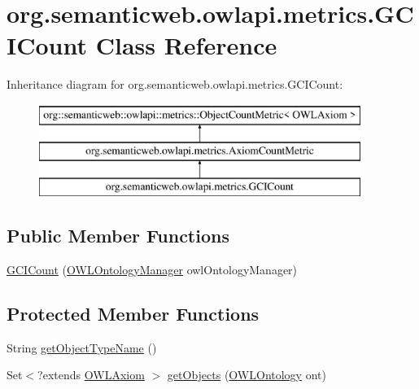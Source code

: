 \hypertarget{classorg_1_1semanticweb_1_1owlapi_1_1metrics_1_1_g_c_i_count}{\section{org.\-semanticweb.\-owlapi.\-metrics.\-G\-C\-I\-Count Class Reference}
\label{classorg_1_1semanticweb_1_1owlapi_1_1metrics_1_1_g_c_i_count}
}
Inheritance diagram for org.\-semanticweb.\-owlapi.\-metrics.\-G\-C\-I\-Count\-:\begin{figure}[H]
\begin{center}
\leavevmode
\includegraphics[height=3.000000cm]{classorg_1_1semanticweb_1_1owlapi_1_1metrics_1_1_g_c_i_count}
\end{center}
\end{figure}
\subsection*{Public Member Functions}
\begin{DoxyCompactItemize}
\item 
\hyperlink{classorg_1_1semanticweb_1_1owlapi_1_1metrics_1_1_g_c_i_count_a8bb59b6539e3c448c78168fefa54969f}{G\-C\-I\-Count} (\hyperlink{interfaceorg_1_1semanticweb_1_1owlapi_1_1model_1_1_o_w_l_ontology_manager}{O\-W\-L\-Ontology\-Manager} owl\-Ontology\-Manager)
\end{DoxyCompactItemize}
\subsection*{Protected Member Functions}
\begin{DoxyCompactItemize}
\item 
String \hyperlink{classorg_1_1semanticweb_1_1owlapi_1_1metrics_1_1_g_c_i_count_a0a45f120439e6c54787a4cf54cf50fb7}{get\-Object\-Type\-Name} ()
\item 
Set$<$?extends \hyperlink{interfaceorg_1_1semanticweb_1_1owlapi_1_1model_1_1_o_w_l_axiom}{O\-W\-L\-Axiom} $>$ \hyperlink{classorg_1_1semanticweb_1_1owlapi_1_1metrics_1_1_g_c_i_count_a7cad98ae33c71676db2229eafca09ee9}{get\-Objects} (\hyperlink{interfaceorg_1_1semanticweb_1_1owlapi_1_1model_1_1_o_w_l_ontology}{O\-W\-L\-Ontology} ont)
\end{DoxyCompactItemize}


